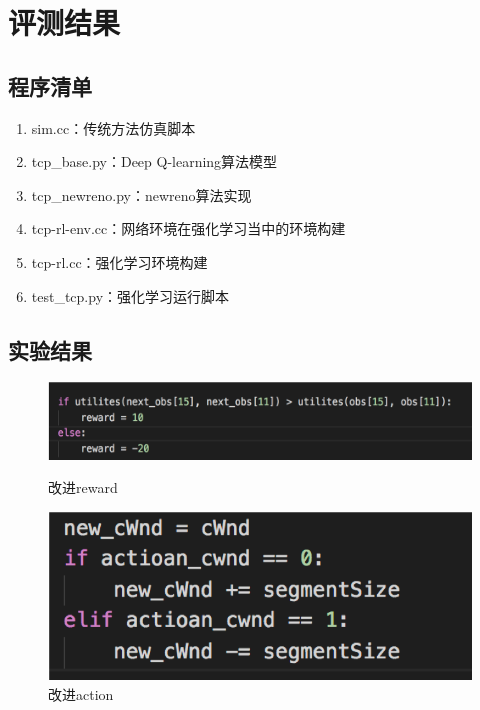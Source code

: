 \section{评测结果}

\subsection{程序清单}

\begin{enumerate}
\item sim.cc：传统方法仿真脚本
\item tcp\_base.py：Deep Q-learning算法模型
\item tcp\_newreno.py：newreno算法实现
\item tcp-rl-env.cc：网络环境在强化学习当中的环境构建
\item tcp-rl.cc：强化学习环境构建
\item test\_tcp.py：强化学习运行脚本
\end{enumerate}

\subsection{实验结果}

\begin{figure}[htbp]
	\centering
	\includegraphics[width=0.8\linewidth]{figure/figure7.png}
	\caption{改进reward}
	\label{figure7}
	\centering
	\includegraphics[width=0.6\linewidth]{figure/figure8.png}
	\caption{改进action}
	\label{figure8}
\end{figure}

